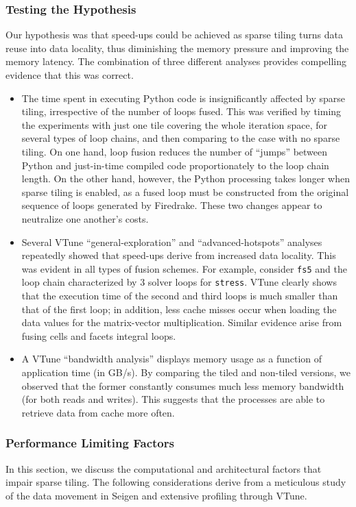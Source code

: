 \subsubsection{Testing the Hypothesis}
Our hypothesis was that speed-ups could be achieved as sparse tiling turns data reuse into data locality, thus diminishing the memory pressure and improving the memory latency. The combination of three different analyses provides compelling evidence that this was correct.

\begin{itemize}
\item The time spent in executing Python code is insignificantly affected by sparse tiling, irrespective of the number of loops fused. This was verified by timing the experiments with just one tile covering the whole iteration space, for several types of loop chains, and then comparing to the case with no sparse tiling. On one hand, loop fusion reduces the number of ``jumps'' between Python and just-in-time compiled code proportionately to the loop chain length. On the other hand, however, the Python processing takes longer when sparse tiling is enabled, as a fused loop must be constructed from the original sequence of loops generated by Firedrake. These two changes appear to neutralize one another's costs.
\item Several VTune ``general-exploration'' and ``advanced-hotspots'' analyses repeatedly showed that speed-ups derive from increased data locality. This was evident in all types of fusion schemes. For example, consider {\tt fs5} and the loop chain characterized by 3 solver loops for {\tt stress}. VTune clearly shows that the execution time of the second and third loops is much smaller than that of the first loop; in addition, less cache misses occur when loading the data values for the matrix-vector multiplication. Similar evidence arise from fusing cells and facets integral loops.
\item A VTune ``bandwidth analysis'' displays memory usage as a function of application time (in GB/s). By comparing the tiled and non-tiled versions, we observed that the former constantly consumes much less memory bandwidth (for both reads and writes). This suggests that the processes are able to retrieve data from cache more often.
\end{itemize}

\subsubsection{Performance Limiting Factors}
In this section, we discuss the computational and architectural factors that impair sparse tiling. The following considerations derive from a meticulous study of the data movement in Seigen and extensive profiling through VTune. 

